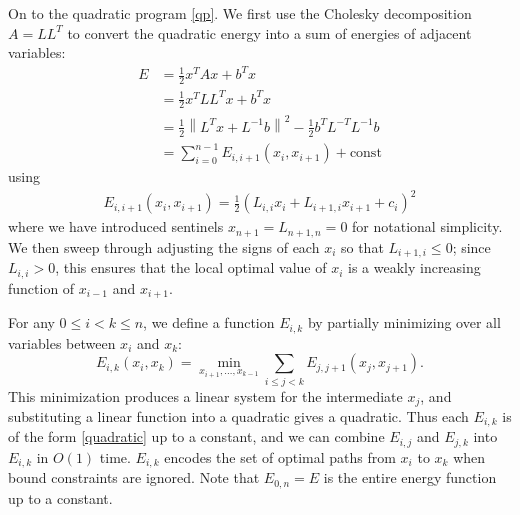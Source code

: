 \documentclass[11pt]{article}
\begin{document}
On to the quadratic program \cref{qp}.  We first use the Cholesky decomposition $A = L L^T$ to convert the quadratic energy into a sum of energies of adjacent variables:
\begin{align*}
E &= \frac{1}{2} x^T A x + b^T x  \\
  &= \frac{1}{2} x^T L L^T x + b^T x \\
  &= \frac{1}{2} \left\|L^T x + L^{-1}b \right\|^2 - \frac{1}{2} b^T L^{-T} L^{-1} b \\
  &= \sum_{i=0}^{n-1} E_{i,i+1}(x_i,x_{i+1}) + \textrm{const}
\end{align*}
using
\begin{align} \label{quadratic}
E_{i,i+1}(x_i,x_{i+1}) = \frac{1}{2} (L_{i,i} x_i + L_{i+1,i} x_{i+1} + c_i)^2
\end{align}
where we have introduced sentinels $x_{n+1} = L_{n+1,n} = 0$ for notational simplicity.  We then sweep through adjusting the signs of each $x_i$ so that $L_{i+1,i} \le 0$; since $L_{i,i} > 0$, this
ensures that the local optimal value of $x_i$ is a weakly increasing function of $x_{i-1}$ and $x_{i+1}$.

For any $0 \le i < k \le n$, we define a function $E_{i,k}$ by partially minimizing over all variables between $x_i$ and $x_k$:
$$E_{i,k}(x_i,x_k) = \min_{x_{i+1}, \ldots, x_{k-1}} \sum_{i \le j < k} E_{j,j+1}(x_j,x_{j+1}).$$
This minimization produces a linear system for the intermediate $x_j$, and substituting a linear function into a quadratic gives a quadratic.  Thus each $E_{i,k}$ is of the form \cref{quadratic} up to a constant,
and we can combine $E_{i,j}$ and $E_{j,k}$ into $E_{i,k}$ in $O(1)$ time.  $E_{i,k}$ encodes the set of optimal paths from $x_i$ to $x_k$ when bound constraints are ignored.  Note that $E_{0,n} = E$
is the entire energy function up to a constant.
\end{document}
